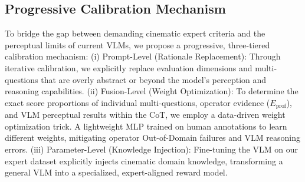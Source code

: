 \documentclass{llmxive}
\begin{document}
\subsection{Progressive Calibration Mechanism}

To bridge the gap between demanding cinematic expert criteria and the perceptual limits of current VLMs, we propose a progressive, three-tiered calibration mechanism: (i) Prompt-Level (Rationale Replacement): Through iterative calibration, we explicitly replace evaluation dimensions and multi-questions that are overly abstract or beyond the model's perception and reasoning capabilities. (ii) Fusion-Level (Weight Optimization): To determine the exact score proportions of individual multi-questions, operator evidence ($E_{\text{prof}}$), and VLM perceptual results within the CoT, we employ a data-driven weight optimization trick. A lightweight MLP trained on human annotations to learn different weights, mitigating operator Out-of-Domain failures and VLM reasoning errors. (iii) Parameter-Level (Knowledge Injection): Fine-tuning the VLM on our expert dataset explicitly injects cinematic domain knowledge, transforming a general VLM into a specialized, expert-aligned reward model.



\end{document}
